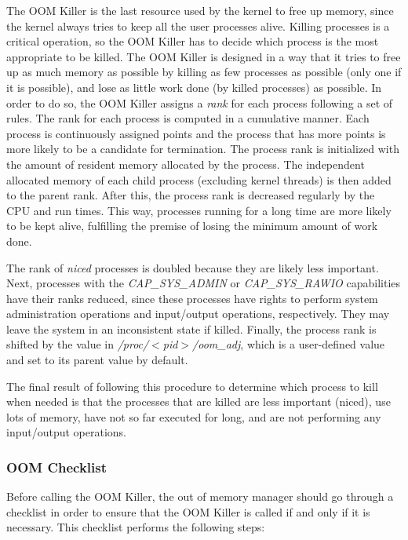 The OOM Killer is the last resource used by the kernel to free up memory,
since the kernel always tries to keep all the user processes alive.
Killing processes is a critical operation, so the OOM Killer has to decide
which process is the most appropriate to be killed. The OOM Killer is
designed in a way that it tries to free up as much memory as possible by
killing as few processes as possible (only one if it is possible), and
lose as little work done (by killed processes) as possible. In order to do
so, the OOM Killer assigns a {\it rank} for each process following a set
of rules. The rank for each process is computed in a cumulative manner.
Each process is continuously assigned points and the process that has
more points is more likely to be a candidate for termination. The process
rank is initialized with the amount of resident memory allocated by the
process. The independent allocated memory of each child process (excluding
kernel threads) is then added to the parent rank. After this, the process
rank is decreased regularly by the CPU and run times. This way, processes
running for a long time are more likely to be kept alive, fulfilling the
premise of losing the minimum amount of work done.

The rank of {\it niced}  processes is doubled because they are likely less
important. Next, processes with the {\it CAP\_SYS\_ADMIN} or
{\it CAP\_SYS\_RAWIO} capabilities have their ranks reduced, since these
processes have rights to perform system administration operations and
input/output operations, respectively. They may leave the system in an
inconsistent state if killed. Finally, the process rank is shifted by the
value in {\it /proc/$<$pid$>$/oom\_adj}, which is a user-defined value
and set to its parent value by default.

The final result of following this procedure to determine which process
to kill when needed is that the processes that are killed are less
important (niced), use lots of memory, have not so far executed for long,
and are not performing any input/output operations.

\subsubsection{OOM Checklist}

Before calling the OOM Killer, the out of memory manager should go through a checklist in order to ensure that the OOM Killer is called if and only if it is necessary. This checklist performs the following steps:

